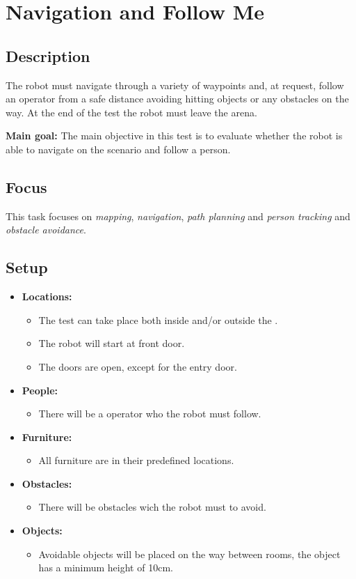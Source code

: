 \section{Navigation and Follow Me}
\label{test:navigation-and-follow-me}

\subsection*{Description}
The robot must navigate through a variety of waypoints and, at request, follow an operator from a safe distance avoiding hitting objects or any obstacles on the way. At the end of the test the robot must leave the arena.

\noindent \textbf{Main goal:}
The main objective in this test is to evaluate whether the robot is able to navigate on the scenario and follow a person.



\subsection*{Focus}
This task focuses on \textit{mapping}, \textit{navigation}, \textit{path planning} and \textit{person tracking} and \textit{obstacle avoidance}.

\subsection*{Setup}
\begin{itemize}[nosep]	
	\item \textbf{Locations:} 
	\begin{itemize}
		\item The test can take place both inside and/or outside the \Arena{}.
		\item The robot will start at front door.
		\item The doors are open, except for the entry door.
	\end{itemize}	 
	\item \textbf{People:} 
	\begin{itemize}
		\item There will be a operator who the robot must follow.
	\end{itemize}
	\item \textbf{Furniture:} 
	\begin{itemize}
		\item All furniture are in their predefined locations.
	\end{itemize}
	\item \textbf{Obstacles:} 
	\begin{itemize}
		\item There will be obstacles wich the robot must to avoid.
	\end{itemize}
    \item \textbf{Objects:} 
    \begin{itemize}
		\item Avoidable objects will be placed on the way between rooms, the object has a minimum height of 10cm.
	\end{itemize}
\end{itemize}

